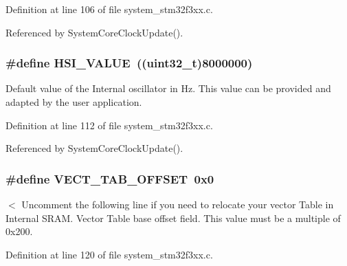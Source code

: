 Definition at line 106 of file system\+\_\+stm32f3xx.\+c.



Referenced by System\+Core\+Clock\+Update().

\hypertarget{group___s_t_m32_f3xx___system___private___defines_gaaa8c76e274d0f6dd2cefb5d0b17fbc37}{}
\subsubsection[{H\+S\+I\+\_\+\+V\+A\+L\+U\+E}]{\setlength{\rightskip}{0pt plus 5cm}\#define H\+S\+I\+\_\+\+V\+A\+L\+U\+E~((uint32\+\_\+t)8000000)}\label{group___s_t_m32_f3xx___system___private___defines_gaaa8c76e274d0f6dd2cefb5d0b17fbc37}
Default value of the Internal oscillator in Hz. This value can be provided and adapted by the user application. 

Definition at line 112 of file system\+\_\+stm32f3xx.\+c.



Referenced by System\+Core\+Clock\+Update().

\hypertarget{group___s_t_m32_f3xx___system___private___defines_ga40e1495541cbb4acbe3f1819bd87a9fe}{}
\subsubsection[{V\+E\+C\+T\+\_\+\+T\+A\+B\+\_\+\+O\+F\+F\+S\+E\+T}]{\setlength{\rightskip}{0pt plus 5cm}\#define V\+E\+C\+T\+\_\+\+T\+A\+B\+\_\+\+O\+F\+F\+S\+E\+T~0x0}\label{group___s_t_m32_f3xx___system___private___defines_ga40e1495541cbb4acbe3f1819bd87a9fe}
$<$ Uncomment the following line if you need to relocate your vector Table in Internal S\+R\+A\+M. Vector Table base offset field. This value must be a multiple of 0x200. 

Definition at line 120 of file system\+\_\+stm32f3xx.\+c.

